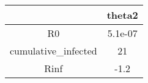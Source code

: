 \begin{tabular}{|c|c|}
\hline
& theta2 \\
\hline
R0 & 5.1e-07 \\
\hline
cumulative_infected & 21 \\
\hline
Rinf & -1.2 \\
\hline
\end{tabular}
